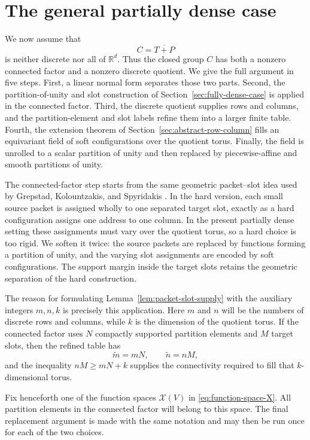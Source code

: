 \documentclass[11pt,reqno]{amsart}
\numberwithin{equation}{section}
\theoremstyle{definition}
\theoremstyle{remark}
\newcommand{\R}{\mathbb R}
\begin{document}
\section{The general partially dense case}
\label{sec:nondiscrete-construction}

We now assume that
\[
 C=\overline{T+P}
\]
is neither discrete nor all of $\R^d$.  Thus the closed group $C$ has both a
nonzero connected factor and a nonzero discrete quotient.  We give the full
argument in five steps.  First, a linear normal form separates those two
parts.  Second, the partition-of-unity and slot construction of Section~\ref{sec:fully-dense-case} is
applied in the connected factor.  Third, the discrete quotient supplies rows
and columns, and the partition-element and slot labels refine them into a
larger finite table.  Fourth, the extension theorem of Section~\ref{sec:abstract-row-column} fills an
equivariant field of soft configurations over the quotient torus.  Finally,
the field is unrolled to a scalar partition of unity and then replaced by
piecewise-affine and smooth partitions of unity.

The connected-factor step starts from the same geometric packet--slot idea
used by Grepstad, Kolountzakis, and Spyridakis
\cite{GrepstadKolountzakisSpyridakis2025}.  In the hard version, each small
source packet is assigned wholly to one separated target slot, exactly as a
hard configuration assigns one address to one column.  In the present
partially dense setting these assignments must vary over the quotient torus,
so a hard choice is too rigid.  We soften it twice: the source packets are
replaced by functions forming a partition of unity, and the varying slot
assignments are encoded by soft configurations.  The support margin inside
the target slots retains the geometric separation of the hard construction.

The reason for formulating Lemma~\ref{lem:packet-slot-supply} with the
auxiliary integers $m,n,k$ is precisely this application.  Here $m$ and $n$
will be the numbers of discrete rows and columns, while $k$ is the dimension
of the quotient torus.  If the connected factor uses $N$ compactly supported
partition elements and $M$ target slots, then the refined table has
\[
 \widetilde m=mN,
 \qquad
 \widetilde n=nM,
\]
and the inequality $nM\ge mN+k$ supplies the connectivity required to fill
that $k$-dimensional torus.

Fix henceforth one of the function spaces $\mathcal X(V)$ in
\eqref{eq:function-space-X}.  All partition elements in the connected
factor will belong to this space.  The final replacement argument is made
with the same notation and may then be run once for each of the two choices.
\end{document}
